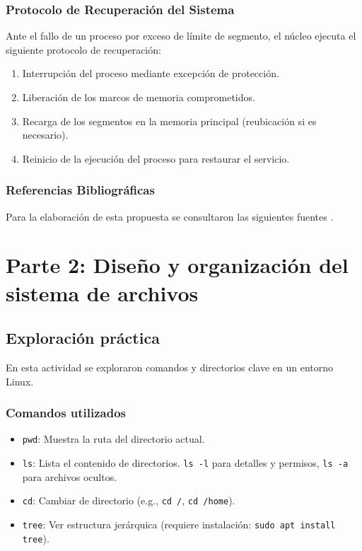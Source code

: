 \documentclass[stu, 12pt, letterpaper, donotrepeattitle, floatsintext, noapacite]{apa7}
\begin{document}
\subsubsection{Protocolo de Recuperación del Sistema}
Ante el fallo de un proceso por exceso de límite de segmento, el núcleo ejecuta el siguiente protocolo de recuperación:
\begin{enumerate}
    \item Interrupción del proceso mediante excepción de protección.
    \item Liberación de los marcos de memoria comprometidos.
    \item Recarga de los segmentos en la memoria principal (reubicación si es necesario).
    \item Reinicio de la ejecución del proceso para restaurar el servicio.
\end{enumerate}

\subsubsection{Referencias Bibliográficas}
Para la elaboración de esta propuesta se consultaron las siguientes fuentes \cite{ual2026, grokiseg, grokipage, analisis}.

\section{Parte 2: Diseño y organización del sistema de archivos}

\subsection{Exploración práctica}
En esta actividad se exploraron comandos y directorios clave en un entorno Linux.

\subsubsection{Comandos utilizados}
\begin{itemize}
    \item \texttt{pwd}: Muestra la ruta del directorio actual.
    \item \texttt{ls}: Lista el contenido de directorios. \texttt{ls -l} para detalles y permisos, \texttt{ls -a} para archivos ocultos.
    \item \texttt{cd}: Cambiar de directorio (e.g., \texttt{cd /}, \texttt{cd /home}).
    \item \texttt{tree}: Ver estructura jerárquica (requiere instalación: \texttt{sudo apt install tree}).
\end{itemize}
\end{document}
